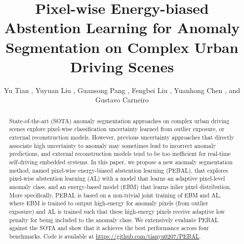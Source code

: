 \documentclass[runningheads]{llncs}
\begin{document}
\pagestyle{headings}
\mainmatter
\def\ECCVSubNumber{6295}  

\title{Pixel-wise Energy-biased Abstention Learning for Anomaly Segmentation on Complex Urban Driving Scenes } 



\author{Yu Tian ,
Yuyuan Liu , 
Guansong Pang , 
Fengbei Liu , 
Yuanhong Chen , and
Gustavo Carneiro }



\maketitle



\vspace{-20pt}

\begin{abstract}

State-of-the-art (SOTA) anomaly segmentation approaches on complex urban driving scenes explore pixel-wise classification uncertainty learned from outlier exposure, or external reconstruction models.
However, 
previous uncertainty approaches that directly associate high uncertainty to anomaly may sometimes lead to incorrect anomaly predictions, and 
external reconstruction models tend to be too inefficient for real-time self-driving embedded systems. 
In this paper, we propose a new anomaly segmentation method, named pixel-wise energy-biased abstention learning (PEBAL), that explores pixel-wise abstention learning (AL) with a model that 
learns 
an adaptive pixel-level anomaly class, and an energy-based model (EBM) that learns inlier pixel distribution.
More specifically, PEBAL is based on a non-trivial joint training of EBM and AL, where EBM is trained to output high-energy for anomaly pixels (from outlier exposure) and AL is trained such that these high-energy pixels receive adaptive low penalty for being included to
the anomaly class.
We extensively evaluate PEBAL against the SOTA and show that it achieves the best performance across four benchmarks. 
Code is available at \url{https://github.com/tianyu0207/PEBAL}.




\end{abstract}


\vspace{-30pt}
\end{document}
